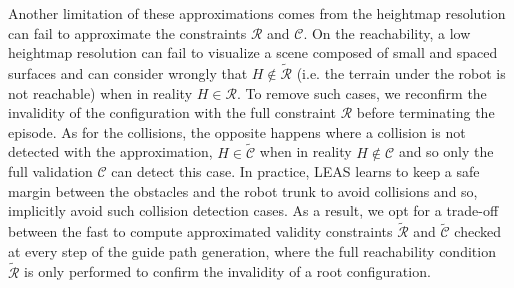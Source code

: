 
Another limitation of these approximations comes from the heightmap resolution can fail to approximate the constraints $\mathcal{R}$ and $\mathcal{C}$.
On the reachability, a low heightmap resolution can fail to visualize a scene composed of small and spaced surfaces and can consider wrongly that $H \notin \tilde{\mathcal{R}}$ (i.e. the terrain under the robot is not reachable) when in reality $H \in \mathcal{R}$.
To remove such cases, we reconfirm the invalidity of the configuration with the full constraint $\mathcal{R}$ before terminating the episode.
As for the collisions, the opposite happens where a collision is not detected with the approximation, $H \in \tilde{\mathcal{C}}$ when in reality $H \notin \mathcal{C}$ and so only the full validation $\mathcal{C}$ can detect this case.
In practice, LEAS learns to keep a safe margin between the obstacles and the robot trunk to avoid collisions and so, implicitly avoid such collision detection cases.
As a result, we opt for a trade-off between the fast to compute approximated validity constraints $\tilde{\mathcal{R}}$ and $\tilde{\mathcal{C}}$ checked at every step of the guide path generation, where the full reachability condition $\tilde{\mathcal{R}}$ is only performed to confirm the invalidity of a root configuration.

